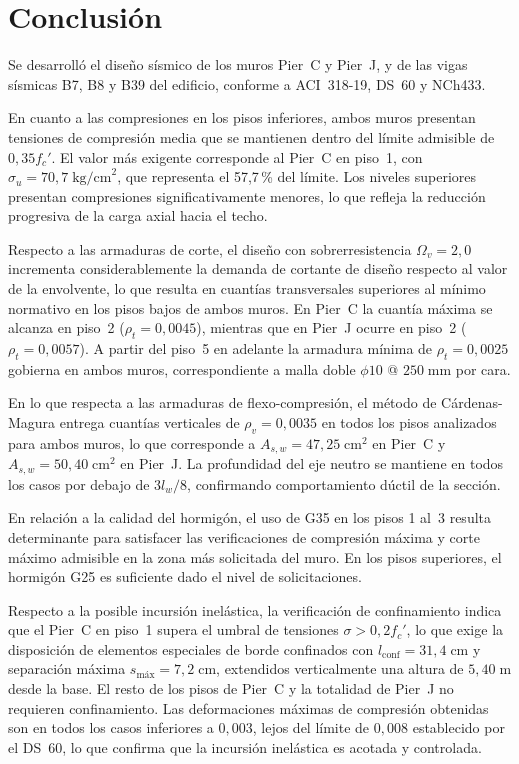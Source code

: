 \section{Conclusión}

Se desarrolló el diseño sísmico de los muros Pier~C y Pier~J, y de las vigas sísmicas B7, B8 y B39
del edificio, conforme a ACI~318-19, DS~60 y NCh433.

En cuanto a las compresiones en los pisos inferiores, ambos muros presentan tensiones de compresión
media que se mantienen dentro del límite admisible de $0{,}35 f_c'$. El valor más exigente corresponde
al Pier~C en piso~1, con $\sigma_u = 70{,}7\;\text{kg/cm}^2$, que representa el 57,7\,\% del límite.
Los niveles superiores presentan compresiones significativamente menores, lo que refleja la reducción
progresiva de la carga axial hacia el techo.

Respecto a las armaduras de corte, el diseño con sobrerresistencia $\Omega_v = 2{,}0$ incrementa
considerablemente la demanda de cortante de diseño respecto al valor de la envolvente, lo que resulta
en cuantías transversales superiores al mínimo normativo en los pisos bajos de ambos muros. En
Pier~C la cuantía máxima se alcanza en piso~2 ($\rho_t = 0{,}0045$), mientras que en Pier~J ocurre
en piso~2 ($\rho_t = 0{,}0057$). A partir del piso~5 en adelante la armadura mínima de
$\rho_t = 0{,}0025$ gobierna en ambos muros, correspondiente a malla doble $\phi10$ @ $250\;\text{mm}$
por cara.

En lo que respecta a las armaduras de flexo-compresión, el método de Cárdenas-Magura entrega
cuantías verticales de $\rho_v = 0{,}0035$ en todos los pisos analizados para ambos muros, lo que
corresponde a $A_{s,w} = 47{,}25\;\text{cm}^2$ en Pier~C y $A_{s,w} = 50{,}40\;\text{cm}^2$ en
Pier~J. La profundidad del eje neutro se mantiene en todos los casos por debajo de $3l_w/8$,
confirmando comportamiento dúctil de la sección.

En relación a la calidad del hormigón, el uso de G35 en los pisos 1 al~3 resulta determinante para
satisfacer las verificaciones de compresión máxima y corte máximo admisible en la zona más solicitada
del muro. En los pisos superiores, el hormigón G25 es suficiente dado el nivel de solicitaciones.

Respecto a la posible incursión inelástica, la verificación de confinamiento indica que el Pier~C en
piso~1 supera el umbral de tensiones $\sigma > 0{,}2f_c'$, lo que exige la disposición de elementos
especiales de borde confinados con $l_\text{conf} = 31{,}4\;\text{cm}$ y separación máxima
$s_\text{máx} = 7{,}2\;\text{cm}$, extendidos verticalmente una altura de $5{,}40\;\text{m}$ desde
la base. El resto de los pisos de Pier~C y la totalidad de Pier~J no requieren confinamiento. Las
deformaciones máximas de compresión obtenidas son en todos los casos inferiores a $0{,}003$, lejos
del límite de $0{,}008$ establecido por el DS~60, lo que confirma que la incursión inelástica es
acotada y controlada.


